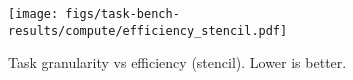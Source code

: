 \begin{figure}[t]
\centering
\texttt{[image: figs/task-bench-results/compute/efficiency\_stencil.pdf]}
\caption{Task granularity vs efficiency (stencil). Lower is better.\label{fig:efficiency}}
\end{figure}
